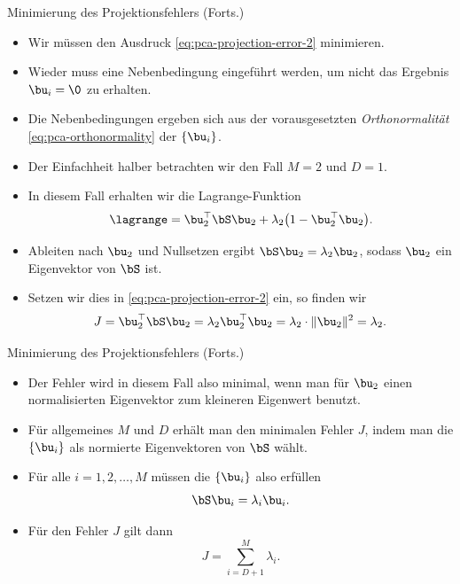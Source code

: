 \begin{frame}{Minimierung des Projektionsfehlers (Forts.)}{}
	\begin{itemize}
		\item Wir müssen den Ausdruck \eqref{eq:pca-projection-error-2} minimieren.
		\item Wieder muss eine Nebenbedingung eingeführt werden, um nicht das Ergebnis $\bu_i = \0$ zu erhalten.
		\item Die Nebenbedingungen ergeben sich aus der vorausgesetzten \textit{Orthonormalität} \eqref{eq:pca-orthonormality} der $\{ \bu_i \}$.
		\item Der Einfachheit halber betrachten wir den Fall $M = 2$ und $D = 1$.
		\item In diesem Fall erhalten wir die Lagrange-Funktion
		\begin{equation}
			\lagrange = \bu_2^\top \bS \bu_2 + \lambda_2 \bigl( 1 - \bu_2^\top \bu_2 \bigr).
		\end{equation}
		\item Ableiten nach $\bu_2$ und Nullsetzen ergibt $\bS \bu_2 = \lambda_2 \bu_2$, sodass $\bu_2$ ein Eigenvektor von $\bS$ ist.
		\item Setzen wir dies in \eqref{eq:pca-projection-error-2} ein, so finden wir
		\begin{equation}
			J
				= \bu_2^\top \bS \bu_2
				= \lambda_2 \bu_2^\top \bu_2
				= \lambda_2 \cdot \Vert \bu_2 \Vert^2
				= \lambda_2.
		\end{equation}
	\end{itemize}
\end{frame}


\begin{frame}{Minimierung des Projektionsfehlers (Forts.)}{}
	\begin{itemize}
		\item Der Fehler wird in diesem Fall also minimal, wenn man für $\bu_2$ einen normalisierten Eigenvektor zum kleineren Eigenwert benutzt.
		\item Für allgemeines $M$ und $D$ erhält man den minimalen Fehler $J$, indem man die $\{ \bu_i \}$ als normierte Eigenvektoren
			von $\bS$ wählt.
		\item Für alle $i = 1, 2, \ldots, M$ müssen die $\{ \bu_i \}$ also erfüllen
		\begin{equation}
			\bS \bu_i = \lambda_i \bu_i.
		\end{equation}
		\item Für den Fehler $J$ gilt dann
		\begin{equation}
			J = \sum_{i=D+1}^M \lambda_i.
		\end{equation}
	\end{itemize}
\end{frame}


